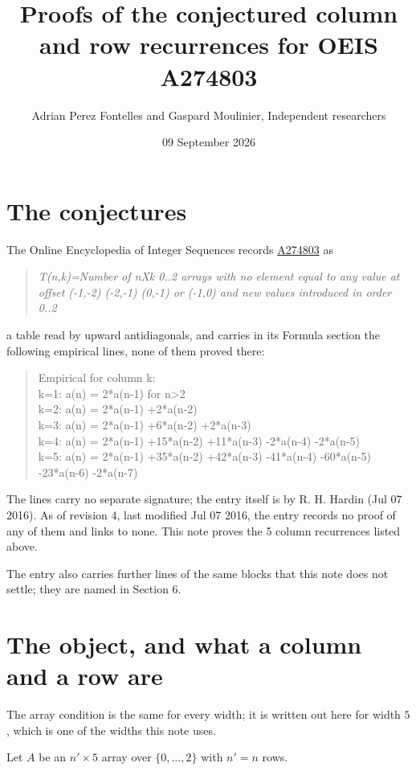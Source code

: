 \documentclass[11pt]{article}
\title{Proofs of the conjectured column and row recurrences for OEIS A274803}
\author{Adrian Perez Fontelles and Gaspard Moulinier, Independent researchers}
\date{09 September 2026}
\theoremstyle{definition}
\begin{document}
\maketitle
\section{The conjectures}

The Online Encyclopedia of Integer Sequences records \href{https://oeis.org/A274803}{A274803} as

\begin{quote}\itshape T(n,k)=Number of nXk 0..2 arrays with no element equal to any value at offset (-1,-2) (-2,-1) (0,-1) or (-1,0) and new values introduced in order 0..2\end{quote}

a table read by upward antidiagonals, and carries in its Formula section the following empirical lines, none of them proved there:

\begin{quote}\ttfamily Empirical for column k:\\
k=1: a(n) = 2*a(n-1) for n>2\\k=2: a(n) = 2*a(n-1) +2*a(n-2)\\k=3: a(n) = 2*a(n-1) +6*a(n-2) +2*a(n-3)\\k=4: a(n) = 2*a(n-1) +15*a(n-2) +11*a(n-3) -2*a(n-4) -2*a(n-5)\\k=5: a(n) = 2*a(n-1) +35*a(n-2) +42*a(n-3) -41*a(n-4) -60*a(n-5) -23*a(n-6) -2*a(n-7)\end{quote}

The lines carry no separate signature; the entry itself is by R. H. Hardin (Jul 07 2016). As of revision 4, last modified Jul 07 2016, the entry records no proof of any of them and links to none. This note proves the 5 column recurrences listed above.

The entry also carries further lines of the same blocks that this note does not settle; they are named in Section 6.

\section{The object, and what a column and a row are}

The array condition is the same for every width; it is written out here for width $5$, which is one of the widths this note uses.

Let $A$ be an $n' \times 5$ array over $\{0,\dots,2\}$ with $n' = n$ rows.
\end{document}
